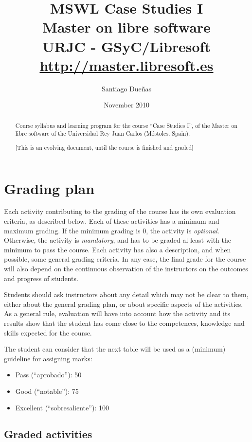 \documentclass[a4paper]{article}
\title{MSWL Case Studies I \\
Master on libre software \\
URJC - GSyC/Libresoft \\
\url{http://master.libresoft.es}}
\author{Santiago Dueñas}
\date{November 2010}
\begin{document}
\maketitle

\begin{abstract}
Course syllabus and learning program for the course ``Case Studies I'', 
of the Master on libre software of the Universidad Rey Juan Carlos (Móstoles, Spain).

[This is an evolving document, until the course is finished and graded]
\end{abstract}

\tableofcontents

\section{Grading plan}

Each activity contributing to the grading of the course has its own evaluation criteria, 
as described below. Each of these activities has a minimum and maximum grading. If the 
minimum grading is 0, the activity is \textit{optional}. Otherwise, the activity is \textit{mandatory}, and 
has to be graded al least with the minimum to pass the course. Each activity has also a 
description, and when possible, some general grading criteria. In any case, the final grade 
for the course will also depend on the continuous observation of the instructors on the 
outcomes and progress of students.

Students should ask instructors about any detail which may not be clear to them, 
either about the general grading plan, or about specific aspects of the activities. 
As a general rule, evaluation will have into account how the activity and its results 
show that the student has come close to the competences, knowledge and skills expected 
for the course.

The student can consider that the next table will be used as a (minimum) guideline for 
assigning marks:

\begin{itemize}
\item Pass (``aprobado''): 50
\item Good (``notable''): 75
\item Excellent (``sobresaliente''): 100
\end{itemize}

\subsection{Graded activities}
\end{document}
